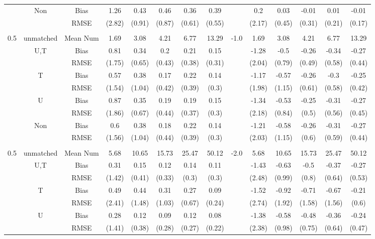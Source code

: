 \begin{tabular}{@{\extracolsep{5pt}}lc|cccccc|lccccc}
 & Non & Bias & 1.26 & 0.43 & 0.46 & 0.36 & 0.39 &  & 0.2 & 0.03 & -0.01 & 0.01 & -0.01 \\
 &  & RMSE & (2.82) & (0.91) & (0.87) & (0.61) & (0.55) &  & (2.17) & (0.45) & (0.31) & (0.21) & (0.17) \\
 &  &  &  &  &  &  &  &  &  &  &  &  &  \\
0.5 & unmatched & Mean Num & 1.69 & 3.08 & 4.21 & 6.77 & 13.29 & -1.0 & 1.69 & 3.08 & 4.21 & 6.77 & 13.29 \\
 & U,T & Bias & 0.81 & 0.34 & 0.2 & 0.21 & 0.15 &  & -1.28 & -0.5 & -0.26 & -0.34 & -0.27 \\
 &  & RMSE & (1.75) & (0.65) & (0.43) & (0.38) & (0.31) &  & (2.04) & (0.79) & (0.49) & (0.58) & (0.44) \\
 & T & Bias & 0.57 & 0.38 & 0.17 & 0.22 & 0.14 &  & -1.17 & -0.57 & -0.26 & -0.3 & -0.25 \\
 &  & RMSE & (1.54) & (1.04) & (0.42) & (0.39) & (0.3) &  & (1.98) & (1.15) & (0.61) & (0.58) & (0.42) \\
 & U & Bias & 0.87 & 0.35 & 0.19 & 0.19 & 0.15 &  & -1.34 & -0.53 & -0.25 & -0.31 & -0.27 \\
 &  & RMSE & (1.86) & (0.67) & (0.44) & (0.37) & (0.3) &  & (2.18) & (0.84) & (0.5) & (0.56) & (0.45) \\
 & Non & Bias & 0.6 & 0.38 & 0.18 & 0.22 & 0.14 &  & -1.21 & -0.58 & -0.26 & -0.31 & -0.27 \\
 &  & RMSE & (1.56) & (1.04) & (0.44) & (0.39) & (0.3) &  & (2.03) & (1.15) & (0.6) & (0.59) & (0.44) \\
 &  &  &  &  &  &  &  &  &  &  &  &  &  \\
0.5 & unmatched & Mean Num & 5.68 & 10.65 & 15.73 & 25.47 & 50.12 & -2.0 & 5.68 & 10.65 & 15.73 & 25.47 & 50.12 \\
 & U,T & Bias & 0.31 & 0.15 & 0.12 & 0.14 & 0.11 &  & -1.43 & -0.63 & -0.5 & -0.37 & -0.27 \\
 &  & RMSE & (1.42) & (0.41) & (0.33) & (0.3) & (0.3) &  & (2.48) & (0.99) & (0.8) & (0.64) & (0.53) \\
 & T & Bias & 0.49 & 0.44 & 0.31 & 0.27 & 0.09 &  & -1.52 & -0.92 & -0.71 & -0.67 & -0.21 \\
 &  & RMSE & (2.41) & (1.48) & (1.03) & (0.67) & (0.24) &  & (2.74) & (1.92) & (1.58) & (1.56) & (0.6) \\
 & U & Bias & 0.28 & 0.12 & 0.09 & 0.12 & 0.08 &  & -1.38 & -0.58 & -0.48 & -0.36 & -0.24 \\
 &  & RMSE & (1.41) & (0.38) & (0.28) & (0.27) & (0.22) &  & (2.38) & (0.98) & (0.75) & (0.64) & (0.47) \\

\end{tabular}
